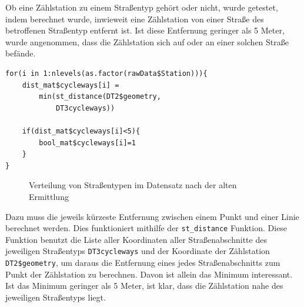 \documentclass[a4paper,12pt]{thesis}
\begin{document}
Ob eine Zählstation zu einem Straßentyp gehört oder nicht, wurde getestet, indem berechnet wurde, inwieweit eine Zählstation von einer Straße des betroffenen Straßentyp entfernt ist. Ist diese Entfernung geringer als 5 Meter, wurde angenommen, dass die Zählstation sich auf oder an einer solchen Straße befände. 

\begin{lstlisting}[caption={Teste den Straßentyp},label=code:streettype_a]
for(i in 1:nlevels(as.factor(rawData$Station))){
	dist_mat$cycleways[i] =
		min(st_distance(DT2$geometry, 
			DT3cycleways))
			
	if(dist_mat$cycleways[i]<5){
		bool_mat$cycleways[i]=1
	}
}
\end{lstlisting}

\begin{figure}[!ht]%
	\centering
	\qquad
	\caption{Verteilung von Straßentypen im Datensatz nach der alten Ermittlung}
	\label{Straßentypen}%
\end{figure}

Dazu muss die jeweils kürzeste Entfernung zwischen einem Punkt und einer Linie berechnet werden. Dies funktioniert mithilfe der \lstinline|st_distance| Funktion. Diese Funktion benutzt die Liste aller Koordinaten aller Straßenabschnitte des jeweiligen Straßentyps \lstinline|DT3cycleways| und der Koordinate der Zählstation \lstinline|DT2$geometry|, um daraus die Entfernung eines jedes Straßenabschnitts zum Punkt der Zählstation zu berechnen. Davon ist allein das Minimum interessant. Ist das Minimum geringer als 5 Meter, ist klar, dass die Zählstation nahe des jeweiligen Straßentyps liegt.\\
\end{document}
